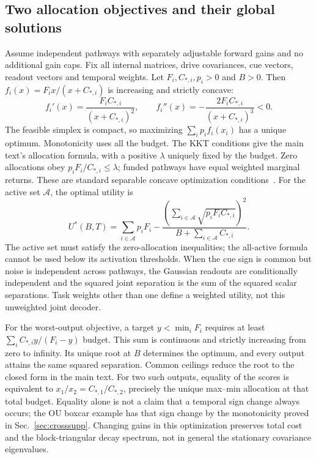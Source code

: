 \subsection{Two allocation objectives and their global solutions}

Assume independent pathways with separately adjustable forward
gains and no additional gain caps. Fix all internal matrices,
drive covariances, cue vectors, readout vectors and temporal
weights. Let \(F_i,C_{*,i},p_i>0\) and \(B>0\). Then
\(f_i(x)=F_i x/(x+C_{*,i})\) is increasing and strictly concave:
\[
 f_i'(x)=\frac{F_iC_{*,i}}{(x+C_{*,i})^2},\qquad
 f_i''(x)=-\frac{2F_iC_{*,i}}{(x+C_{*,i})^3}<0.
\]
The feasible simplex is compact, so maximizing
\(\sum_i p_i f_i(x_i)\) has a unique optimum. Monotonicity
uses all the budget. The KKT conditions give the main text's
allocation formula, with a positive \(\lambda\) uniquely fixed
by the budget. Zero allocations obey
\(p_iF_i/C_{*,i}\le\lambda\); funded pathways have equal
weighted marginal returns. These are standard separable concave
optimization conditions~\cite{boyd2004convex}.
For the active set \(\mathcal A\), the optimal utility is
\begin{equation}
 U^*(B,T)=\sum_{i\in\mathcal A}p_iF_i
  -\frac{\left(\sum_{i\in\mathcal A}
                     \sqrt{p_iF_iC_{*,i}}\right)^2}
         {B+\sum_{i\in\mathcal A}C_{*,i}}.
\end{equation}
The active set must satisfy the zero-allocation inequalities;
the all-active formula cannot be used below its activation thresholds.
When the cue sign is common but noise is independent across
pathways, the Gaussian readouts are conditionally independent and
the squared joint separation is the sum of the squared scalar
separations. Task weights other than one define a weighted
utility, not this unweighted joint decoder.

For the worst-output objective, a target \(y<\min_i F_i\)
requires at least \(\sum_i C_{*,i}y/(F_i-y)\) budget. This sum
is continuous and strictly increasing from zero to infinity.
Its unique root at \(B\) determines the optimum, and every output
attains the same squared separation. Common ceilings reduce the
root to the closed form in the main text. For two such outputs,
equality of the scores is equivalent to
\(x_1/x_2=C_{*,1}/C_{*,2}\), precisely the unique max--min
allocation at that total budget. Equality alone is not a claim
that a temporal sign change always occurs; the OU boxcar example
has that sign change by the monotonicity proved in Sec.~\ref{sec:crosssupp}.
Changing gains in this optimization preserves total cost and
the block-triangular decay spectrum, not in general the stationary
covariance eigenvalues.

